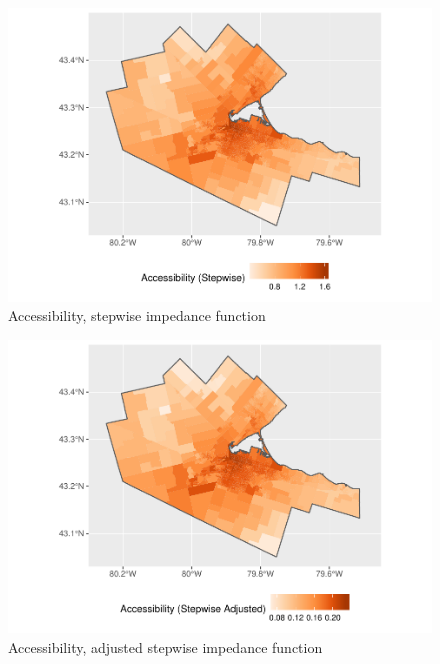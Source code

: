 \documentclass[10pt,letterpaper]{article}
\begin{document}
\begin{figure}
\includegraphics[width=0.95\linewidth]{Supply_and_Demand_Inflation_in_FCA_Methods_v2.0_files/figure-latex/fig16-map-accessibility-stepwise-1} \caption{\label{fig:fig16-map-accessibility-stepwise}Accessibility, stepwise impedance function}\label{fig:fig16-map-accessibility-stepwise}
\end{figure}

\begin{figure}
\includegraphics[width=0.95\linewidth]{Supply_and_Demand_Inflation_in_FCA_Methods_v2.0_files/figure-latex/fig17-map-accessibility-stepwise-adjusted-1} \caption{\label{fig:fig17-map-accessibility-stepwise-adjusted}Accessibility, adjusted stepwise impedance function}\label{fig:fig17-map-accessibility-stepwise-adjusted}
\end{figure}
\end{document}
